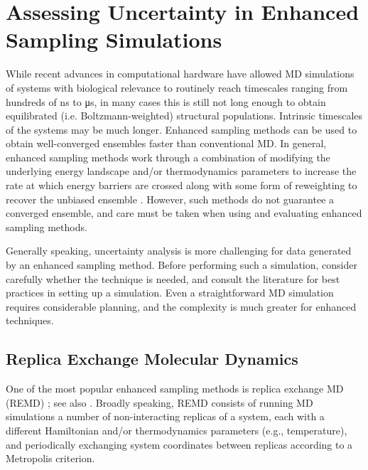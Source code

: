 \section{Assessing Uncertainty in Enhanced Sampling Simulations}
\label{sec:enhanced}

While recent advances in computational hardware have allowed MD simulations of systems with biological relevance to routinely reach timescales ranging from hundreds of \si{\nano\second} to \si{\micro\second}, in many cases this is still not long enough to obtain equilibrated (i.e. Boltzmann-weighted) structural populations.  Intrinsic timescales of the systems may be much longer.  
Enhanced sampling methods can be used to obtain well-converged ensembles faster than conventional MD. In general, enhanced sampling methods work through a combination of modifying the underlying energy landscape and/or thermodynamics parameters to increase the rate at which energy barriers are crossed along with some form of reweighting to recover the unbiased ensemble \cite{Zuckerman2011}. However, such methods do not guarantee a converged ensemble, and care must be taken when using and evaluating enhanced sampling methods.

Generally speaking, uncertainty analysis is more challenging for data generated by an enhanced sampling method.
Before performing such a simulation, consider carefully whether the technique is needed, and consult the literature for best practices in setting up a simulation.
Even a straightforward MD simulation requires considerable planning, and the complexity is much greater for enhanced techniques.

\subsection{Replica Exchange Molecular Dynamics}
One of the most popular enhanced sampling methods is replica exchange MD (REMD) \citep{Sugita1999}; see also \cite{Swendsen-1986}. Broadly speaking, REMD consists of running MD simulations a number of non-interacting replicas of a system, each with a different Hamiltonian and/or thermodynamics parameters (e.g., temperature), and periodically exchanging system coordinates between replicas according to a Metropolis criterion.

